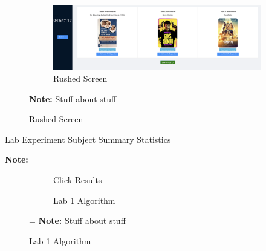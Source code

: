 \documentclass[12pt,letterpaper]{article}
\begin{document}
\begin{figure}[ht]
\begin{subfigure}{.5\textwidth}
         \label{fig:lab_rush_instructions}
    \end{subfigure}
     \begin{subfigure}{.5\textwidth}
       \centering
        \includegraphics[width=1\linewidth]{Misc Screenshots/RushedScreenShot.png}  
        \caption{Rushed Screen}
         \label{fig:lab_rush_screenshot}
    \end{subfigure}

\footnotesize \textbf{Note:} Stuff about stuff
\end{figure}


\begin{table}[]
    \caption{Lab Experiment Subject Summary Statistics}
    \begin{center}
    \label{tab:samplab}
    \end{center}
\footnotesize \textbf{Note:} 
\end{table}


\begin{figure}[ht]
\caption{Lab Experiment 1 Results}
\label{fig:lab1}
    \begin{subfigure}{.5\textwidth} 
        \centering
        \caption{Click Results}
        \label{fig:lab1_click}
        \end{subfigure}
    \begin{subfigure}{.5\textwidth}
       \centering
        \caption{Lab 1 Algorithm}
         \label{fig:lab1_algo}
    \end{subfigure}
=
\footnotesize \textbf{Note:} Stuff about stuff
\end{figure}

\end{document}
